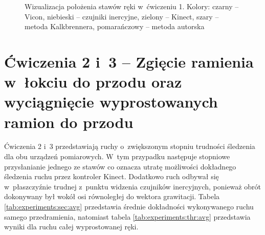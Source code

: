 \begin{figure}[!htb]
	\captionsetup{singlelinecheck=off}
	\centering
	\caption[Wizualizacja położenia stawów ręki w~ćwiczeniu 1]{Wizualizacja położenia stawów ręki w~ćwiczeniu 1. Kolory: czarny -- Vicon, niebieski -- czujniki inercyjne, zielony -- Kinect, szary -- metoda Kalkbrennera, pomarańczowy -- metoda autorska}	
\end{figure}

\section*{Ćwiczenia 2 i~3 -- Zgięcie ramienia w~łokciu do przodu oraz wyciągnięcie wyprostowanych ramion do przodu}
Ćwiczenia 2 i~3 przedstawiają ruchy o~zwiększonym stopniu trudności śledzenia dla obu urządzeń pomiarowych. W~tym przypadku następuje stopniowe przysłanianie jednego ze stawów co oznacza utratę możliwości dokładnego śledzenia ruchu przez kontroler Kinect. Dodatkowo ruch odbywał się w~płaszczyźnie trudnej z~punktu widzenia czujników inercyjnych, ponieważ obrót dokonywany był wokół osi równoległej do wektora grawitacji. Tabela \ref{tab:experiments:sec:avg} przedstawia średnie dokładności wykonywanego ruchu samego przedramienia, natomiast tabela \ref{tab:experiments:thr:avg} przedstawia wyniki dla ruchu całej wyprostowanej ręki.

